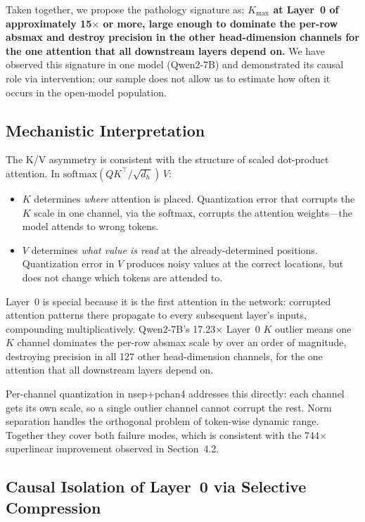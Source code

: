 \documentclass[11pt]{article}
\begin{document}
Taken together, we propose the pathology signature as: \textbf{$K_{\max}$ at Layer~0 of approximately 15$\times$ or more, large enough to dominate the per-row absmax and destroy precision in the other head-dimension channels for the one attention that all downstream layers depend on.} We have observed this signature in one model (Qwen2-7B) and demonstrated its causal role via intervention; our sample does not allow us to estimate how often it occurs in the open-model population.

\subsection{Mechanistic Interpretation}

The K/V asymmetry is consistent with the structure of scaled dot-product attention. In $\mathrm{softmax}(QK^{\top}/\sqrt{d_h})\,V$:
\begin{itemize}[nosep]
    \item $K$ determines \emph{where} attention is placed. Quantization error that corrupts the $K$ scale in one channel, via the softmax, corrupts the attention weights---the model attends to wrong tokens.
    \item $V$ determines \emph{what value is read} at the already-determined positions. Quantization error in $V$ produces noisy values at the correct locations, but does not change which tokens are attended to.
\end{itemize}
Layer~0 is special because it is the first attention in the network: corrupted attention patterns there propagate to every subsequent layer's inputs, compounding multiplicatively. Qwen2-7B's 17.23$\times$ Layer~0 $K$ outlier means one $K$ channel dominates the per-row absmax scale by over an order of magnitude, destroying precision in all 127 other head-dimension channels, for the one attention that all downstream layers depend on.

Per-channel quantization in nsep+pchan4 addresses this directly: each channel gets its own scale, so a single outlier channel cannot corrupt the rest. Norm separation handles the orthogonal problem of token-wise dynamic range. Together they cover both failure modes, which is consistent with the 744$\times$ superlinear improvement observed in Section~4.2.

\subsection{Causal Isolation of Layer~0 via Selective Compression}
\label{sec:layer0_causal}
\end{document}
